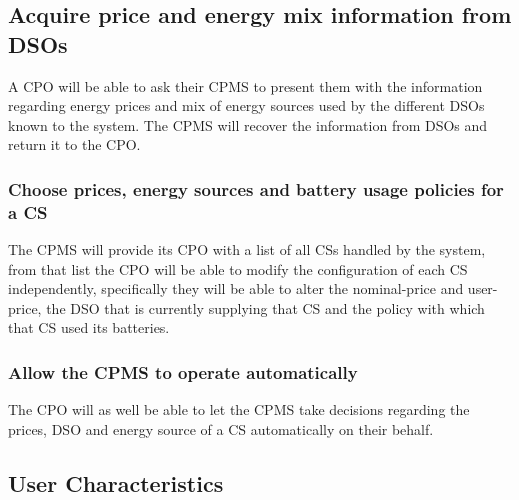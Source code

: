 \documentclass[11pt]{article}
\begin{document}
\subsection{Acquire price and energy mix information from DSOs}

A CPO will be able to ask their CPMS to present them with the information regarding energy prices and mix of energy sources used by the different DSOs known to the system. The CPMS will recover the information from DSOs and return it to the CPO.

\subsubsection{Choose prices, energy sources and battery usage policies for a CS}

The CPMS will provide its CPO with a list of all CSs handled by the system, from that list the CPO will be able to modify the configuration of each CS independently, specifically they will be able to alter the nominal-price and user-price, the DSO that is currently supplying that CS and the policy with which that CS used its batteries.

\subsubsection{Allow the CPMS to operate automatically}

The CPO will as well be able to let the CPMS take decisions regarding the prices, DSO and energy source of a CS automatically on their behalf.

\subsection{User Characteristics}
\end{document}
